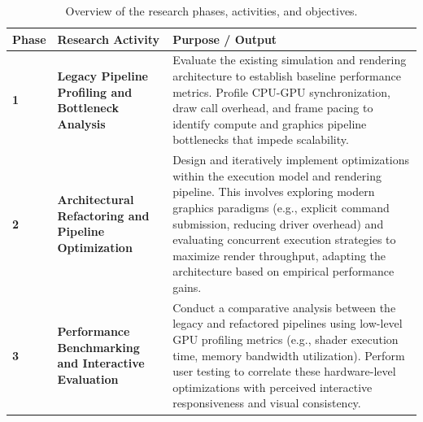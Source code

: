 \begin{table}[htbp]
\centering
\small
\renewcommand{\arraystretch}{1.2}
\begin{tabular}{l p{3.5cm} p{6.5cm}}
\hline
\textbf{Phase} & \textbf{Research Activity} & \textbf{Purpose / Output} \\
\hline
\textbf{1} & \textbf{Legacy Pipeline Profiling and Bottleneck Analysis} & Evaluate the existing simulation and rendering architecture to establish baseline performance metrics. Profile CPU-GPU synchronization, draw call overhead, and frame pacing to identify compute and graphics pipeline bottlenecks that impede scalability. \\
\hline
\textbf{2} & \textbf{Architectural Refactoring and Pipeline Optimization} & Design and iteratively implement optimizations within the execution model and rendering pipeline. This involves exploring modern graphics paradigms (e.g., explicit command submission, reducing driver overhead) and evaluating concurrent execution strategies to maximize render throughput, adapting the architecture based on empirical performance gains. \\
\hline
\textbf{3} & \textbf{Performance Benchmarking and Interactive Evaluation} & Conduct a comparative analysis between the legacy and refactored pipelines using low-level GPU profiling metrics (e.g., shader execution time, memory bandwidth utilization). Perform user testing to correlate these hardware-level optimizations with perceived interactive responsiveness and visual consistency. \\
\hline
\end{tabular}
\caption{Overview of the research phases, activities, and objectives.}
\label{tab:research_phases}
\end{table}

